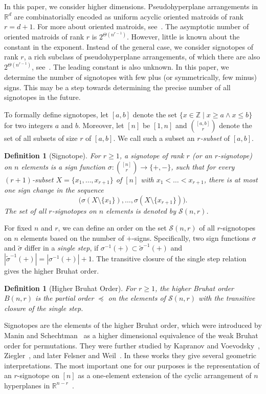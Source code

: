 \documentclass[a4paper,11pt]{amsart}
\newtheorem{definition}[theorem]{Definition}
\newcommand{\binnr}{\binom{[n]}{r}}
\newcommand{\R}{\mathbb{R}}
\newcommand{\Z}{\mathbb{Z}}
\newcommand{\calS}{\mathcal{S}}
\newcommand{\defi}[1]{\textcolor{defblue}{\emph{#1}}}
\begin{document}
In this paper, we consider higher dimensions. 
Pseudohyperplane arrangements in $\R^d$ are combinatorially encoded as uniform acyclic oriented matroids of rank $r= d+1$. 
For more about oriented matroids, see~\cite{BjoernerLVWSZ1993}.
The asymptotic number of oriented matroids of rank $r$ is $2^{\Theta(n^{r-1})}$. 
However, little is known about the constant in the exponent. 
Instead of the general case, we consider signotopes of rank $r$, a rich subclass of pseudohyperplane arrangements, of which there are also $2^{\Theta(n^{r-1})}$, see~\cite{Balko19, BergoldFS23}.  
The leading constant is also unknown.
In this paper, we determine the number of signotopes with few plus (or symmetrically, few minus) signs.
This may be a step towards determining the precise number of all signotopes in the future. 

To formally define signotopes, let $[a,b]$ denote the set $\{x \in \Z \mid x \geq a \land x \leq b\}$ for two integers $a$ and $b$.
Moreover, let $[n]$ be $[1,n]$ and ${[a,b] \choose r}$ denote the set of all subsets of size $r$ of $[a,b]$.
We call such a subset an \defi{$r$-subset} of $[a,b]$.

\begin{definition}[Signotope]
    For $r \geq 1$, a \defi{signotope of rank $r$} (or an \defi{$r$-signotope}) on $n$ elements is a sign function $\sigma: \binnr \to \{+,-\}$, such that for every $(r+1)$-subset $X = \{x_1, \dots, x_{r+1}\}$ of $[n]$ with $x_1 < \dots < x_{r+1}$, there is at most one sign change in the sequence 
    \[
        \Big(\sigma(X\setminus\{x_1\}), \dots, \sigma(X\setminus\{x_{r+1}\})\Big).
    \]
    The set of all $r$-signotopes on $n$ elements is denoted by $\calS(n,r)$.
\end{definition}

For fixed $n$ and $r$, we can define an order on the set $\calS(n,r)$ of all $r$-signotopes on $n$ elements based on the number of $+$-signs. 
Specifically, two sign functions $\sigma$ and $\tilde{\sigma}$ differ in a \defi{single step}, if $\sigma^{-1}(+) \subset \tilde{\sigma}^{-1}(+)$ and $|\tilde{\sigma}^{-1}(+)| = |\sigma^{-1}(+)| + 1$.
The transitive closure of the single step relation gives the higher Bruhat order. 
\begin{definition}[Higher Bruhat Order]
    For $r \geq 1$, the \defi{higher Bruhat order} $B(n,r)$ is the partial order $\preceq$ on the elements of $\calS(n,r)$ with the transitive closure of the single step.
\end{definition}
Signotopes are the elements of the higher Bruhat order, which were introduced by Manin and Schechtman~\cite{manin1989arrangements} as a higher dimensional equivalence of the weak Bruhat order for permutations. 
They were further studied by Kapranov and Voevodsky~\cite{KaVo91}, Ziegler~\cite{Ziegler1993}, and later Felsner and Weil~\cite{FelsnerWeil2000}. 
In these works they give several geometric interpretations. 
The most important one for our purposes is the representation of an $r$-signotope on $[n]$ as a one-element extension of the cyclic arrangement of $n$ hyperplanes in $\R^{n-r}$~\cite{Ziegler1993}. 
\end{document}
